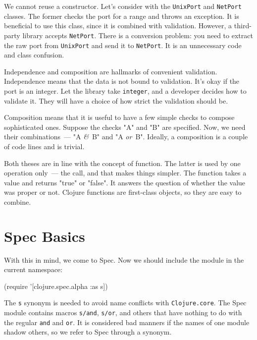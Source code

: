 We cannot reuse a constructor. Let's consider with the \verb|UnixPort| and \verb|NetPort| classes. The former checks the port for a range and throws an exception. It is beneficial to use this class, since it is combined with validation. However, a third-party library accepts \verb|NetPort|. There is a conversion problem: you need to extract the raw port from \verb|UnixPort| and send it to \verb|NetPort|. It is an unnecessary code and class confusion.


Independence and composition are hallmarks of convenient validation. Independence means that the data is not bound to validation. It's okay if the port is an integer. Let the library take \verb|integer|, and a developer decides how to validate it. They will have a choice of how strict the validation should be.


Composition means that it is useful to have a few simple checks to compose sophisticated ones. Suppose the checks "A" and "B" are specified. Now, we need their combinations~--- "A \emph{\&}~B" and "A \emph{or}~B". Ideally, a composition is a couple of code lines and is trivial.


Both theses are in line with the concept of function.  The latter is used by one operation only~--- the call, and that makes things simpler. The function takes a value and returns "true" or "false". It answers the question of whether the value was proper or not. Clojure functions are first-class objects, so they are easy to combine.

\section{Spec Basics}

With this in mind, we come to Spec. Now we should include the module in the current namespace:

\begin{english}
  \begin{clojure}
(require '[clojure.spec.alpha :as s])
  \end{clojure}
\end{english}

The \verb|s| synonym is needed to avoid name conflicts with \verb|Clojure.core|. The Spec module contains macros \verb|s/and|, \verb|s/or|, and others that have nothing to do with the regular \verb|and| and \verb|or|. It is considered bad manners if the names of one module shadow others, so we refer to Spec through a synonym.


